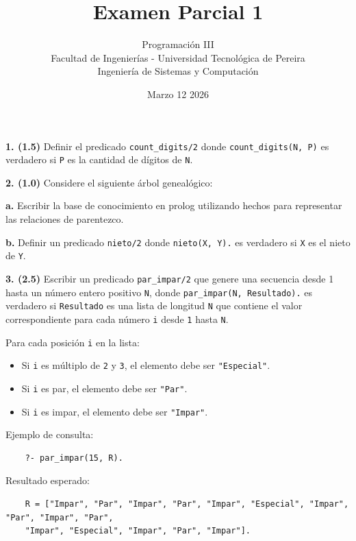 \documentclass{article}
\title{Examen Parcial 1}
\author{Programación III \\ Facultad de Ingenierías - Universidad Tecnológica de Pereira \\ Ingeniería de Sistemas y Computación}
\date{Marzo 12 2026}
\begin{document}
\maketitle
\thispagestyle{empty}

\textbf{1. (1.5)} Definir el predicado \texttt{count\_digits/2} donde \texttt{count\_digits(N, P)} es verdadero si \texttt{P} es la cantidad de dígitos de \texttt{N}. \newline \newline

\textbf{2. (1.0)} Considere el siguiente árbol genealógico:

\begin{center}
\end{center}

\textbf{a. } Escribir la base de conocimiento en prolog utilizando hechos para representar las relaciones de parentezco.

\textbf{b. } Definir un predicado \texttt{nieto/2} donde \texttt{nieto(X, Y).} es verdadero si \texttt{X} es el nieto de \texttt{Y}. \newline \newline


\textbf{3. (2.5)} Escribir un predicado \texttt{par\_impar/2} que genere una secuencia desde 1 hasta un número entero positivo \texttt{N}, donde \texttt{par\_impar(N, Resultado).} es verdadero si
\texttt{Resultado} es una lista de longitud \texttt{N} que contiene el valor correspondiente para cada número \texttt{i} desde \texttt{1} hasta \texttt{N}. \newline

Para cada posición \texttt{i} en la lista: 

\begin{itemize}
  \item Si \texttt{i} es múltiplo de \texttt{2} y \texttt{3}, el elemento debe ser \texttt{"Especial"}.
  \item Si \texttt{i} es par, el elemento debe ser \texttt{"Par"}.
  \item Si \texttt{i} es impar, el elemento debe ser \texttt{"Impar"}.
\end{itemize}


Ejemplo de consulta:
\begin{verbatim}
    ?- par_impar(15, R).
\end{verbatim}

Resultado esperado:
\begin{verbatim}
    R = ["Impar", "Par", "Impar", "Par", "Impar", "Especial", "Impar", "Par", "Impar", "Par", 
    "Impar", "Especial", "Impar", "Par", "Impar"].
\end{verbatim}
\end{document}
